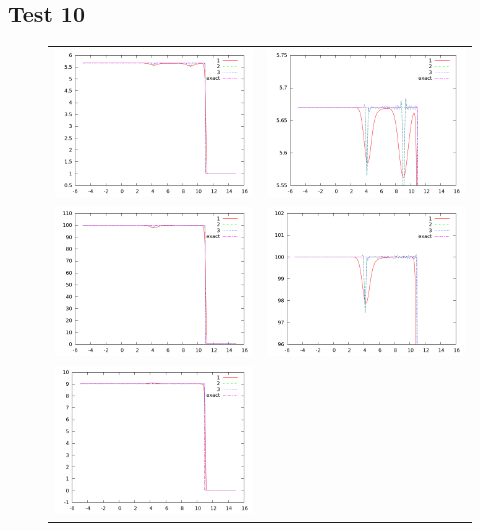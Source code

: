\documentclass[letterpaper,12pt]{article}
\begin{document}
\subsection{Test 10}

\begin{figure}[h]
  \begin{center}
	\begin{tabular}{cc}
      \includegraphics[width=.4\textwidth]{den_T10.png} &
	  \includegraphics[width=.4\textwidth]{den10zoom.png} \\
	  \includegraphics[width=.4\textwidth]{prs_T10.png} &	
	  \includegraphics[width=.4\textwidth]{prs10zoom.png} \\
      \includegraphics[width=.4\textwidth]{vel_T10.png} &	

\end{tabular}
\end{center}
\end{figure}
\end{document}
